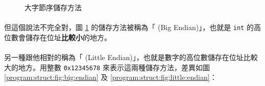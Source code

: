 \documentclass[12pt,a4paper,oneside]{article}
\begin{document}
\begin{CJK}{UTF8}{bkai}
\begin{figure}[h!]
\centering
{}
\caption{大字節序儲存方法}
\label{program:struct:fig:big:endian:16}
\end{figure}

\paragraph{}但這個說法不完全對，圖 \ref{program:struct:fig:big:endian:16} 的儲存方法被稱為「 (Big Endian)」，也就是 \lstinline!int! 的高位數會儲存在位址\textbf{比較小}的地方。
\paragraph{}另一種跟他相對的稱為「 (Little Endian)」，也就是數字的高位數儲存在位址比較大的地方。用整數 \texttt{0x12345678} 來表示這兩種儲存方法，差異如圖 \ref{program:struct:fig:big:endian} 及 \ref{program:struct:fig:little:endian}：


\end{CJK}
\end{document}
